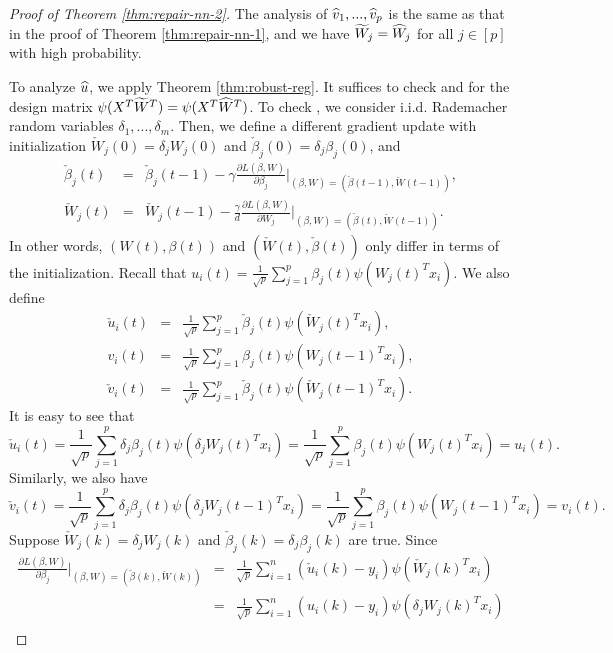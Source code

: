 \begin{proof}[Proof of Theorem \ref{thm:repair-nn-2}]
The analysis of $\widehat{v}_1,...,\widehat{v}_p$ is the same as that in the proof of Theorem \ref{thm:repair-nn-1}, and we have $\widetilde{W}_j=\widehat{W}_j$ for all $j\in[p]$ with high probability.

To analyze $\widehat{u}$, we apply Theorem \ref{thm:robust-reg}. It suffices to check \conditionAp{} and \conditionB{} for the design matrix $\psi(X^T\widetilde{W}^T)=\psi(X^T\widehat{W}^T)$. To check \conditionAp, we consider i.i.d. Rademacher random variables $\delta_1,...,\delta_m$. Then, we define a different gradient update with initialization $\check{W}_j(0)=\delta_jW_j(0)$ and $\check{\beta}_j(0)=\delta_j\beta_j(0)$, and
\begin{eqnarray*}
\check{\beta}_j(t) &=& \check{\beta}_j(t-1) - \gamma\frac{\partial L(\beta,W)}{\partial \beta_j}|_{(\beta,W)=(\check{\beta}(t-1),\check{W}(t-1))}, \\
\check{W}_j(t) &=& \check{W}_j(t-1) - \frac{\gamma}{d}\frac{\partial L(\beta,W)}{\partial W_j}|_{(\beta,W)=(\check{\beta}(t),\check{W}(t-1))}.
\end{eqnarray*}
In other words, $(W(t),\beta(t))$ and $(\check{W}(t),\check{\beta}(t))$ only differ in terms of the initialization. Recall that $u_i(t)=\frac{1}{\sqrt{p}}\sum_{j=1}^p\beta_j(t)\psi(W_j(t)^Tx_i)$. We also define 
\begin{eqnarray*}
\check{u}_i(t) &=& \frac{1}{\sqrt{p}}\sum_{j=1}^p\check{\beta}_j(t)\psi(\check{W}_j(t)^Tx_i), \\
v_i(t) &=& \frac{1}{\sqrt{p}}\sum_{j=1}^p\beta_j(t)\psi(W_j(t-1)^Tx_i), \\
\check{v}_i(t) &=& \frac{1}{\sqrt{p}}\sum_{j=1}^p\check{\beta}_j(t)\psi(\check{W}_j(t-1)^Tx_i).
\end{eqnarray*}
It is easy to see that
$$\check{u}_i(t)=\frac{1}{\sqrt{p}}\sum_{j=1}^p\delta_j\beta_j(t)\psi(\delta_jW_j(t)^Tx_i)=\frac{1}{\sqrt{p}}\sum_{j=1}^p\beta_j(t)\psi(W_j(t)^Tx_i)=u_i(t).$$
Similarly, we also have
$$\check{v}_i(t)=\frac{1}{\sqrt{p}}\sum_{j=1}^p\delta_j\beta_j(t)\psi(\delta_jW_j(t-1)^Tx_i)=\frac{1}{\sqrt{p}}\sum_{j=1}^p\beta_j(t)\psi(W_j(t-1)^Tx_i)=v_i(t).$$
Suppose $\check{W}_j(k)=\delta_jW_j(k)$ and $\check{\beta}_j(k)=\delta_j\beta_j(k)$ are true. Since
\begin{eqnarray*}
\frac{\partial L(\beta,W)}{\partial \beta_j}|_{(\beta,W)=(\check{\beta}(k),\check{W}(k))} &=& \frac{1}{\sqrt{p}}\sum_{i=1}^n(\check{u}_i(k)-y_i)\psi(\check{W}_j(k)^Tx_i) \\
&=& \frac{1}{\sqrt{p}}\sum_{i=1}^n({u}_i(k)-y_i)\psi(\delta_j{W}_j(k)^Tx_i) \\

\end{eqnarray*}
\end{proof}
